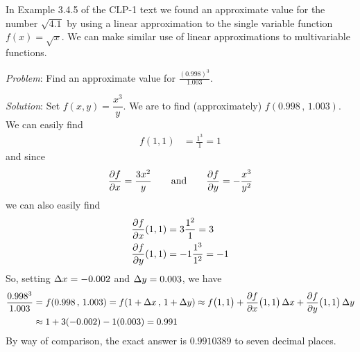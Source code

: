 In Example 3.4.5 of the CLP-1 text we found an approximate
value for the number $\sqrt{4.1}$ by using a linear approximation
to the single variable function $f(x)=\sqrt{x}$. We can make similar use
of linear approximations to multivariable functions.

\begin{eg}\label{eg approx A}
\noindent\textit{Problem}:
Find an approximate value for $\frac{(0.998)^3}{1.003}$.

\medskip
\noindent\textit{Solution}:
Set $f(x,y) = \dfrac{x^3}{y}$. We are to find (approximately) 
$f(0.998\,,\,1.003)$. We can easily find
\begin{align*}
f(1,1) &= \frac{1^3}{1}=1
\end{align*}
and since 
\begin{equation*}
\pdiff{f}{x}=\frac{3x^2}{y}\qquad \text{and}\qquad 
\pdiff{f}{y}=-\frac{x^3}{y^2}
\end{equation*}
we can also easily find
\begin{align*}
\pdiff{f}{x}(1,1) &= 3\frac{1^2}{1}=3 \\
\pdiff{f}{y}(1,1) &= -1\frac{1^3}{1^2}=-1 
\end{align*}
So, setting $\Delta x=-0.002$ and $\Delta y=0.003$, we have
\begin{align*}
\frac{0.998^3}{1.003}
&=f(0.998\,,\,1.003)
=f(1+\De x\,,\,1+\De y)
\approx f\big(1,1\big) 
       + \pdiff{f}{x}\big(1,1\big)\,\De x
       + \pdiff{f}{y}\big(1,1\big)\,\De y \\
&\approx 1 +3(-0.002)-1(0.003)
=0.991
\end{align*}
By way of comparison, the exact answer is $0.9910389$ to seven decimal places.
\end{eg}


